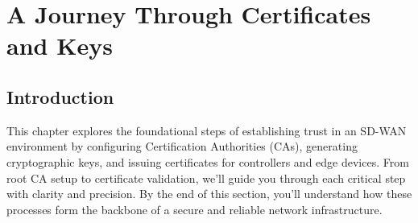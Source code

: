 \documentclass[12pt,english]{report}
\begin{document}
\clearpage %
\vspace*{-1cm} %

\begin{table}[H] %
\centering
{}
\end{table}
\chapter{A Journey Through Certificates and Keys}
\section{Introduction}
 This chapter explores the foundational steps of establishing trust in an SD-WAN environment by configuring Certification Authorities (CAs), generating cryptographic keys, and issuing certificates for controllers and edge devices. From root CA setup to certificate validation, we’ll guide you through each critical step with clarity and precision. By the end of this section, you’ll understand how these processes form the backbone of a secure and reliable network infrastructure.
\end{document}
